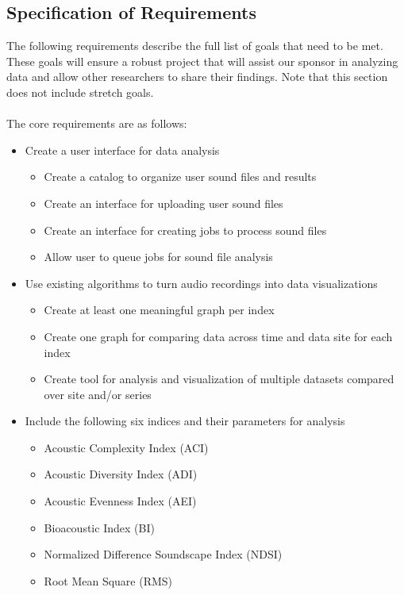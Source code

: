 \subsection{Specification of Requirements}
The following requirements describe the full list of goals that need to be met. These goals will ensure a robust project that will assist our sponsor in analyzing data and allow other researchers to share their findings. Note that this section does not include stretch goals.\\\\
The core requirements are as follows:
\begin{itemize}
  \item Create a user interface for data analysis
  \begin{itemize}
    \item Create a catalog to organize user sound files and results
    \item Create an interface for uploading user sound files
    \item Create an interface for creating jobs to process sound files
    \item Allow user to queue jobs for sound file analysis
  \end{itemize}
  \item Use existing algorithms to turn audio recordings into data visualizations
    \begin{itemize}
      \item Create at least one meaningful graph per index
      \item Create one graph for comparing data across time and data site for each index
      \item Create tool for analysis and visualization of multiple datasets compared over site and/or series
    \end{itemize}
  \item Include the following six indices and their parameters for analysis
    \begin{itemize}
      \item Acoustic Complexity Index (ACI)
      \item Acoustic Diversity Index (ADI)
      \item Acoustic Evenness Index (AEI)
      \item Bioacoustic Index (BI)
      \item Normalized Difference Soundscape Index (NDSI)
      \item Root Mean Square (RMS)
    \end{itemize}

\end{itemize}
